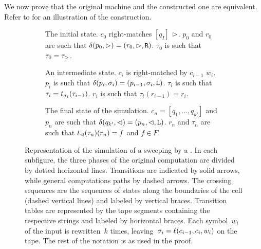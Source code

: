 We now prove that the original machine and the constructed one are equivalent.
Refer to  for an illustration of the construction.
\begin{figure}
	\centering
	\begin{subfigure}[b]{0.32\textwidth}
		\centering
		
		\caption{The initial state.
			$c_0$ right-matches $[q_I]$ \wrt $\rhd$.
			$p_0$ and $r_0$ are such that $\delta(p_0,\rhd)=(r_0,\rhd,\mathtt R)$.
			$\tau_0$ is such that $\tau_0=\tau_\rhd$.\newline}
		\label{sfig:swepkDLAtoNFA-start}
	\end{subfigure}
	\hfill
	\begin{subfigure}[b]{0.32\textwidth}
		\centering
		
		\caption{An intermediate state.
			$c_i$ is right-matched by $c_{i-1}$ \wrt $w_i$.
			$p_i$ is such that $\delta(p_i,\sigma_i)=(p_{i-1},\sigma_i,\mathtt L)$.
			$\tau_i$ is such that $\tau_i=t_{\sigma_i}(\tau_{i-1})$.
			$r_i$ is such that $\tau_i(r_{i-1})=r_i$.}
		\label{sfig:swepkDLAtoNFA-mid}
	\end{subfigure}
	\hfill
	\begin{subfigure}[b]{0.33\textwidth}
		\centering
		
		\caption{The final state of the simulation.
		$c_n=[q_1,\dots,q_{k'}]$ and $p_n$ are such that $\delta(q_{k'},\lhd)=(p_n,\lhd,\mathtt L)$.
		$r_n$ and $\tau_n$ are such that $t_\lhd(\tau_n)(r_n)=f$ and $f\in F$.\newline}
		\label{sfig:swepkDLAtoNFA-end}
	\end{subfigure}

	\caption[Three cases in the simulation of a sweeping \kDLA by a \ONFA.]{Representation of the simulation of a sweeping \kDLA by a \ONFA.
		In each subfigure, the three phases of the original computation are divided by dotted horizontal lines.
		Transitions are indicated by solid arrows, while general computations paths by dashed arrows.
		The crossing sequences are the sequences of states along the boundaries of the cell (dashed vertical lines) and labeled by vertical braces.
		Transition tables are represented by the tape segments containing the respective strings and labeled by horizontal braces.
		Each symbol~$w_i$ of the input is rewritten~$k$ times, leaving~$\sigma_i=\ell(c_{i-1},c_i,w_i)$ on the tape.
		The rest of the notation is as used in the proof.}
	\label{fig:swepkDLAtoNFA}
\end{figure}

